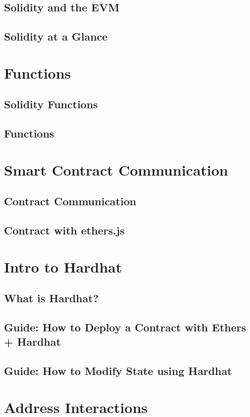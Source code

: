 \documentclass[a4paper, oneside]{book}
\begin{document}
\subsection{Solidity and the EVM}
\subsection{Solidity at a Glance}

\section{Functions}
\subsection{Solidity Functions}
\subsection{Functions}

\section{Smart Contract Communication}
\subsection{Contract Communication}
\subsection{Contract with ethers.js}

\section{Intro to Hardhat}
\subsection{What is Hardhat?}
\subsection{Guide: How to Deploy a Contract with Ethers + Hardhat}
\subsection{Guide: How to Modify State using Hardhat}

\newpage

\section{Address Interactions}
\end{document}
